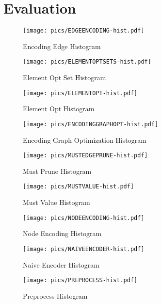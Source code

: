 \section{Evaluation}\label{sec:eval}

\begin{figure}[htb]
	\centering
	\texttt{[image: pics/EDGEENCODING-hist.pdf]}
	\caption{Encoding Edge Histogram}
	\label{fig:edgeencoding}
\end{figure}


\begin{figure}[htb]
	\centering
	\texttt{[image: pics/ELEMENTOPTSETS-hist.pdf]}
	\caption{Element Opt Set Histogram}
	\label{fig:elementoptset}
\end{figure}

\begin{figure}[htb]
	\centering
	\texttt{[image: pics/ELEMENTOPT-hist.pdf]}
	\caption{Element Opt Histogram}
	\label{fig:elementopt}
\end{figure}

\begin{figure}[htb]
	\centering
	\texttt{[image: pics/ENCODINGGRAPHOPT-hist.pdf]}
	\caption{Encoding Graph Optimization Histogram}
	\label{fig:encodinggraph}
\end{figure}

\begin{figure}[htb]
	\centering
	\texttt{[image: pics/MUSTEDGEPRUNE-hist.pdf]}
	\caption{Must Prune Histogram}
	\label{fig:mustedgeprune}
\end{figure}

\begin{figure}[htb]
	\centering
	\texttt{[image: pics/MUSTVALUE-hist.pdf]}
	\caption{Must Value Histogram}
	\label{fig:mustvalue}
\end{figure}

\begin{figure}[htb]
	\centering
	\texttt{[image: pics/NODEENCODING-hist.pdf]}
	\caption{Node Encoding Histogram}
	\label{fig:nodeencoding}
\end{figure}

\begin{figure}[htb]
	\centering
	\texttt{[image: pics/NAIVEENCODER-hist.pdf]}
	\caption{Naive Encoder Histogram}
	\label{fig:naiveencoder}
\end{figure}

\begin{figure}[htb]
	\centering
	\texttt{[image: pics/PREPROCESS-hist.pdf]}
	\caption{Preprocess Histogram}
	\label{fig:preprocess}
\end{figure}

